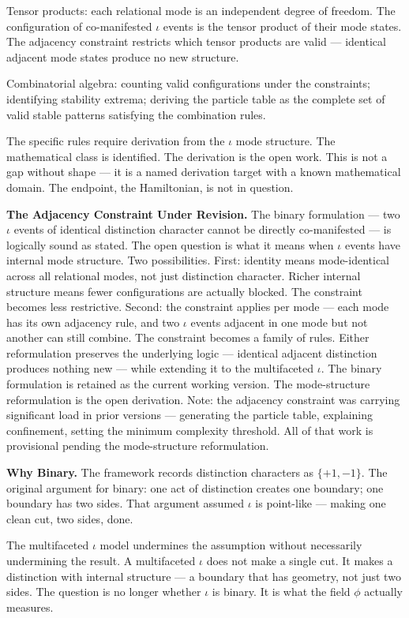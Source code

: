 \documentclass[11pt,letterpaper]{article}
\begin{document}
Tensor products: each relational mode is an independent degree of freedom. The configuration of co-manifested \(\iota\) events is the tensor product of their mode states. The adjacency constraint restricts which tensor products are valid — identical adjacent mode states produce no new structure.

Combinatorial algebra: counting valid configurations under the constraints; identifying stability extrema; deriving the particle table as the complete set of valid stable patterns satisfying the combination rules.

The specific rules require derivation from the \(\iota\) mode structure. The mathematical class is identified. The derivation is the open work. This is not a gap without shape — it is a named derivation target with a known mathematical domain. The endpoint, the Hamiltonian, is not in question.

\textbf{The Adjacency Constraint Under Revision.} The binary formulation — two \(\iota\) events of identical distinction character cannot be directly co-manifested --- is logically sound as stated. The open question is what it means when \(\iota\) events have internal mode structure. Two possibilities. First: identity means mode-identical across all relational modes, not just distinction character. Richer internal structure means fewer configurations are actually blocked. The constraint becomes less restrictive. Second: the constraint applies per mode — each mode has its own adjacency rule, and two \(\iota\) events adjacent in one mode but not another can still combine. The constraint becomes a family of rules. Either reformulation preserves the underlying logic — identical adjacent distinction produces nothing new --- while extending it to the multifaceted \(\iota\). The binary formulation is retained as the current working version. The mode-structure reformulation is the open derivation. Note: the adjacency constraint was carrying significant load in prior versions --- generating the particle table, explaining confinement, setting the minimum complexity threshold. All of that work is provisional pending the mode-structure reformulation.

\textbf{Why Binary.} The framework records distinction characters as \(\{+1,-1\}\). The original argument for binary: one act of distinction creates one boundary; one boundary has two sides. That argument assumed \(\iota\) is point-like --- making one clean cut, two sides, done.

The multifaceted \(\iota\) model undermines the assumption without necessarily undermining the result. A multifaceted \(\iota\) does not make a single cut. It makes a distinction with internal structure --- a boundary that has geometry, not just two sides. The question is no longer whether \(\iota\) is binary. It is what the field \(\phi\) actually measures.
\end{document}
